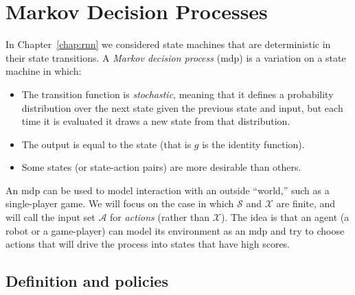 \chapter{Markov Decision Processes}
\label{chap:mdps}

In Chapter~\ref{chap:rnn} we considered state machines that are deterministic
in their state transitions. 
A {\em Markov decision process} ({\sc mdp}) is a variation on a state
machine in which:
\begin{itemize}
\item The transition function is {\em stochastic},
meaning that it defines a probability distribution over the  next
state given the previous state and input, but each time it is
evaluated it draws a new state from that distribution.
\item The output is equal to the state (that is $g$ is the identity
  function).  
\item Some states (or state-action pairs) are more desirable than others.
\end{itemize}

An {\sc mdp} can be used to model interaction with an outside
``world,'' such as a single-player  game.  We will focus on the case in which $\mathcal S$ and
$\mathcal X$ are finite, and will call the input set $\mathcal A$ for
{\em actions} (rather than $\mathcal X$).  The idea is that an agent
(a robot or a game-player) can model its environment as an {\sc mdp}
and try to choose actions that will drive the process into states that
have high scores.


\section{Definition and policies}
\label{sec_mdps}

